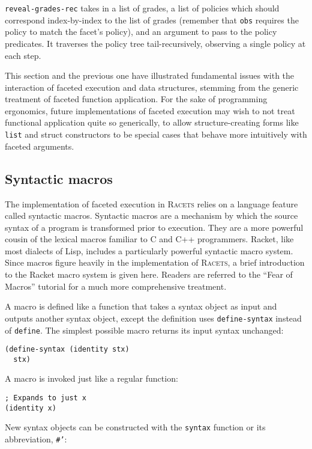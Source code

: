 \documentclass{article}
\begin{document}
\texttt{reveal-grades-rec} takes in a list of grades, a list of policies which should correspond index-by-index to the list of grades (remember that \texttt{obs} requires the policy to match the facet's policy), and an argument to pass to the policy predicates. It traverses the policy tree tail-recursively, observing a single policy at each step.

This section and the previous one have illustrated fundamental issues with the interaction of faceted execution and data structures, stemming from the generic treatment of faceted function application. For the sake of programming ergonomics, future implementations of faceted execution may wish to not treat functional application quite so generically, to allow structure-creating forms like \texttt{list} and struct constructors to be special cases that behave more intuitively with faceted arguments.


\subsection{Syntactic macros}
The implementation of faceted execution in \textsc{Racets} relies on a language feature called syntactic macros. Syntactic macros are a mechanism by which the source syntax of a program is transformed prior to execution. They are a more powerful cousin of the lexical macros familiar to C and C++ programmers. Racket, like most dialects of Lisp, includes a particularly powerful syntactic macro system. Since macros figure heavily in the implementation of \textsc{Racets}, a brief introduction to the Racket macro system is given here. Readers are referred to the ``Fear of Macros'' tutorial \cite{fear-of-macros} for a much more comprehensive treatment.

A macro is defined like a function that takes a syntax object as input and outputs another syntax object, except the definition uses \texttt{define-syntax} instead of \texttt{define}. The simplest possible macro returns its input syntax unchanged:

\begin{lstlisting}
(define-syntax (identity stx)
  stx)
\end{lstlisting}

A macro is invoked just like a regular function:

\begin{lstlisting}
; Expands to just x
(identity x)
\end{lstlisting}

New syntax objects can be constructed with the \texttt{syntax} function or its abbreviation, \texttt{\#'}:
\end{document}
